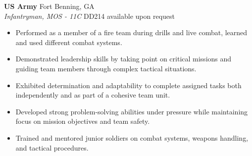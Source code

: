 \vspace{0.75em}

\noindent
\textbf{US Army} \hfill Fort Benning, GA \\
\textit{Infantryman, MOS - 11C} \hfill DD214 available upon request \\
\begin{itemize}[leftmargin=*,noitemsep,topsep=3pt]
    \item Performed as a member of a fire team during drills and live combat, learned and used different combat systems.
    \item Demonstrated leadership skills by taking point on critical missions and guiding team members through complex tactical situations.
    \item Exhibited determination and adaptability to complete assigned tasks both independently and as part of a cohesive team unit.
    \item Developed strong problem-solving abilities under pressure while maintaining focus on mission objectives and team safety.
    \item Trained and mentored junior soldiers on combat systems, weapons handling, and tactical procedures.
\end{itemize}